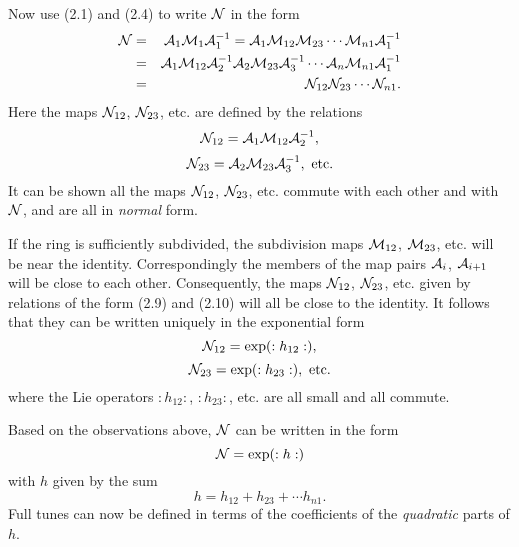 Now use (2.1) and (2.4) to write ${\cal N}$ in the form
\begin{eqnarray}
{\cal N} &=& {\cal A}_1 {\cal M}_1 {\cal A}_1^{-1} = {\cal A}_1
{\cal M}_{12} {\cal M}_{23} \cdots {\cal M}_{n1} {\cal A}_1^{-1} \nonumber \\
&=& {\cal A}_1 {\cal M}_{12} {\cal A}_2^{-1} {\cal A}_2 {\cal
M}_{23} {\cal A}_3^{-1} \cdots {\cal A}_n {\cal M}_{n1} {\cal A}_1^{-1}
\nonumber \\
&=& {\cal N}_{12} {\cal N}_{23}  \cdots {\cal N}_{n1}.
\end{eqnarray}
Here the maps ${\cal N}_{12}$, ${\cal N}_{23}$, etc. are defined by the
relations
\begin{equation}
{\cal N}_{12} = {\cal A}_1 {\cal M}_{12} {\cal A}_2^{-1},
\end{equation}
\begin{equation}
{\cal N}_{23} = {\cal A}_2 {\cal M}_{23} {\cal A}_3^{-1}, \ {\rm etc.}
\end{equation}
It can be shown all the maps ${\cal N}_{12}$, ${\cal N}_{23}$, etc.
commute with each other and with ${\cal N}$, and are all in {\em normal} form.

If the ring is sufficiently subdivided, the subdivision maps ${\cal
M}_{12}$, ${\cal M}_{23}$, etc. will be near the identity.
Correspondingly the members of the map pairs ${\cal A}_i$, ${\cal
A}_{i+1}$ will be close to each other.  Consequently, the maps ${\cal
N}_{12}$, ${\cal N}_{23}$, etc. given by relations of the form (2.9) and
(2.10) will all be close to the identity.  It
follows that they can be written uniquely in the exponential form
\begin{equation}
{\cal N}_{12} = \exp (:h_{12}:),
\end{equation}
\begin{equation}
{\cal N}_{23} = \exp (:h_{23}:), \ {\rm etc.}
\end{equation}
where the Lie operators $:h_{12}:$, $:h_{23}:$, etc. are all small and
all commute.

Based on the observations above, ${\cal N}$ can be written in the form
\begin{equation}
{\cal N} = \exp (:h:)
\end{equation}
with $h$ given by the sum
\begin{equation}
h = h_{12} + h_{23} + \cdots h_{n1}.
\end{equation}
Full tunes can now be defined in terms of the coefficients of the {\em
quadratic} parts of $h$.

